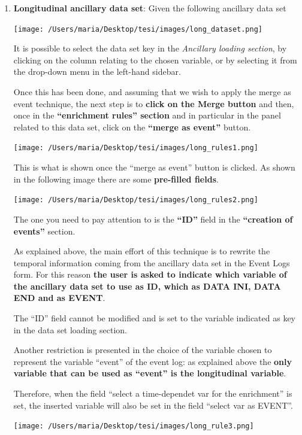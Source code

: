 \documentclass[
]{book}
\begin{document}
\begin{enumerate}
\def\labelenumi{\arabic{enumi}.}
\item
  \textbf{Longitudinal ancillary data set}:
  Given the following ancillary data set

  \texttt{[image: /Users/maria/Desktop/tesi/images/long\_dataset.png]}

  It is possible to select the data set key in the \emph{Ancillary loading section}, by clicking on the column relating to the chosen variable, or by selecting it from the drop-down menu in the left-hand sidebar.

  Once this has been done, and assuming that we wish to apply the merge as event technique, the next step is to \textbf{click on the Merge button} and then, once in the \textbf{``enrichment rules'' section} and in particular in the panel related to this data set, click on the \textbf{``merge as event''} button.

  \texttt{[image: /Users/maria/Desktop/tesi/images/long\_rules1.png]}

  This is what is shown once the ``merge as event'' button is clicked. As shown in the following image there are some \textbf{pre-filled fields}.

  \texttt{[image: /Users/maria/Desktop/tesi/images/long\_rules2.png]}

  The one you need to pay attention to is the \textbf{``ID''} field in the \textbf{``creation of events''} section.

  As explained above, the main effort of this technique is to rewrite the temporal information coming from the ancillary data set in the Event Logs form. For this reason \textbf{the user is asked to indicate which variable of the ancillary data set to use as ID, which as DATA INI, DATA END and as EVENT}.

  The ``ID'' field cannot be modified and is set to the variable indicated as key in the data set loading section.

  Another restriction is presented in the choice of the variable chosen to represent the variable ``event'' of the event log: as explained above the \textbf{only variable that can be used as ``event'' is the longitudinal variable}.

  Therefore, when the field ``select a time-dependet var for the enrichment'' is set, the inserted variable will also be set in the field ``select var as EVENT''.

  \texttt{[image: /Users/maria/Desktop/tesi/images/long\_rule3.png]}


\end{enumerate}
\end{document}
